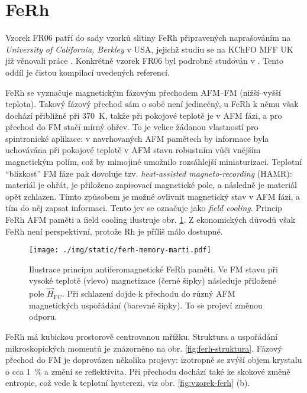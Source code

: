 \section{FeRh}
\label{chap:vzorek-ferh}

Vzorek FR06 patří do sady vzorků slitiny FeRh připravených naprašováním na \emph{University of California, Berkley} v USA, jejichž studiu se na KChFO MFF UK již věnovali práce \cite{brajerLaserovaSpektroskopieMaterialu2015,saidlUltrarychlaLaserovaSpektroskopie2018,kubascikMagnetooptickeStudiumAntiferomagnetickych2019}.
Konkrétně vzorek FR06 byl podrobně studován v \cite{saidlUltrarychlaLaserovaSpektroskopie2018,kubascikMagnetooptickeStudiumAntiferomagnetickych2019}.
Tento oddíl je čistou kompilací uvedených referencí.

FeRh se vyznačuje magnetickým fázovým přechodem AFM--FM (nižší--vyšší teplota).
Takový fázový přechod sám o sobě není jedinečný, u FeRh k němu však dochází přibližně při \SI{370}{\kelvin}, takže při pokojové teplotě je v AFM fázi, a pro přechod do FM stačí mírný ohřev.
To je velice žádanou vlastností pro spintronické aplikace: v navrhovaných AFM pamětech by informace byla uchovávána při pokojové teplotě v AFM stavu robustním vůči vnějším magnetickým polím, což by mimojiné umožnilo rozsáhlejší miniaturizaci.
Teplotní ``blízkost'' FM fáze pak dovoluje tzv. \emph{heat-assisted magneto-recording} (HAMR): materiál je ohřát, je přiloženo zapisovací magnetické pole, a následně je materiál opět zchlazen.
Tímto způsobem je možné ovlivnit magnetický stav v AFM fázi, a tím do něj zapsat informaci.
Tento jev se označuje jako \emph{field cooling}.
Princip FeRh AFM paměti a field cooling ilustruje obr. \ref{fig:ferh-memory}.
Z ekonomických důvodů však FeRh není perspektivní, protože Rh je příliš málo dostupné.

\begin{figure}[htbp]
    \centering
    \texttt{[image: ./img/static/ferh-memory-marti.pdf]}
    \caption{Ilustrace principu antiferomagnetické FeRh paměti.
        Ve FM stavu při vysoké teplotě (vlevo) magnetizace (černé šipky) následuje přiložené pole $\vec{H}_\textrm{FC}$. 
        Při schlazení dojde k přechodu do různý AFM magnetických uspořádání (barevné šipky). To se projeví změnou odporu. \cite{martiRoomtemperatureAntiferromagneticMemory2014}}
    \label{fig:ferh-memory}
\end{figure}

FeRh má kubickou prostorově centrovanou mřížku.
Struktura a uspořádání mikroskopických momentů je znázorněno na obr. \ref{fig:ferh-struktura}.
Fázový přechod do FM je doprovázen několika projevy: izotropně se zvýší objem krystalu o cca \SI{1}{\percent} a změní se reflektivita.
Při přechodu dochází také ke skokové změně entropie, což vede k teplotní hysterezi, viz obr. \ref{fig:vzorek-ferh} (b).

